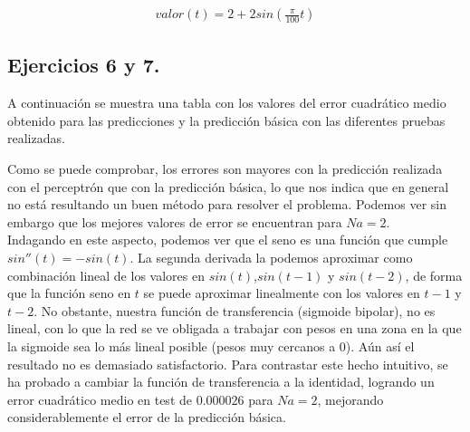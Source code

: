 \documentclass[spanish]{assignment}
\begin{document}
	\begin{align*}
		valor(t) = 2 + 2sin\left(\frac{\pi}{100}t\right)
	\end{align*}
	
	\subsection{Ejercicios 6 y 7.}
	A continuación se muestra una tabla con los valores del error cuadrático medio obtenido para las predicciones y la predicción básica con las diferentes pruebas realizadas.
	
	\vspace{5mm}
	\noindent{}
	\vspace{5mm}
	
	Como se puede comprobar, los errores son mayores con la predicción realizada con el perceptrón que con la predicción básica, lo que nos indica que en general no está resultando un buen método para resolver el problema. Podemos ver sin embargo que los mejores valores de error se encuentran para $Na = 2$.\\
	
	Indagando en este aspecto, podemos ver que el seno es una función que cumple $sin''(t) = -sin(t)$. La segunda derivada la podemos aproximar como combinación lineal de los valores en $sin(t)$,$sin(t-1)$ y $sin(t-2)$, de forma que la función seno en $t$ se puede aproximar linealmente con los valores en $t-1$ y $t-2$.
	No obstante, nuestra función de transferencia (sigmoide bipolar), no es lineal, con lo que la red se ve obligada a trabajar con pesos en una zona en la que la sigmoide sea lo más lineal posible (pesos muy cercanos a 0). Aún así el resultado no es demasiado satisfactorio. Para contrastar este hecho intuitivo, se ha probado a cambiar la función de transferencia a la identidad, logrando un error cuadrático medio en test de $0.000026$ para $Na=2$, mejorando considerablemente el error de la predicción básica.\\
	
\end{document}
